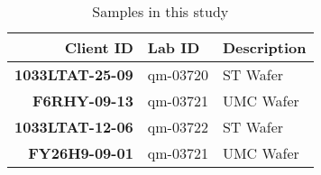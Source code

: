\begin{table}[h]
\begin{tabular}{| r | l | l |}
  \hline
  \textbf{Client ID}      & \textbf{Lab ID} & \textbf{Description} \\
  \hline
  \textbf{1033LTAT-25-09} & qm-03720        & ST Wafer \\
  \hline
  \textbf{F6RHY-09-13}    & qm-03721        & UMC Wafer  \\
  \hline
  \textbf{1033LTAT-12-06} & qm-03722        & ST Wafer \\
  \hline
  \textbf{FY26H9-09-01}   & qm-03721        & UMC Wafer \\
  \hline
\end{tabular}
\caption{Samples in this study}
\label{tab:SampleInfo}
\end{table} 

\endinput
